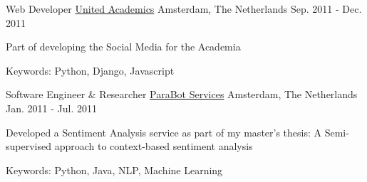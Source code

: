 \begin{cventries}
  \cventry
    {Web Developer} %
    {\href{http://www.ua-foundation.org/}{United Academics}} %
    {Amsterdam, The Netherlands} %
    {Sep. 2011 - Dec. 2011} %
    {
      \begin{cvitems} %
        \item {Part of developing the Social Media for the Academia}
        \item {Keywords: Python, Django, Javascript}
      \end{cvitems}
    }

  \cventry
    {Software Engineer \& Researcher} %
    {\href{http://www.parabots.nl//}{ParaBot Services}} %
    {Amsterdam, The Netherlands} %
    {Jan. 2011 - Jul. 2011} %
    {
      \begin{cvitems} %
        \item {Developed a Sentiment Analysis service as part of my master's thesis: A Semi-supervised approach to context-based sentiment analysis}
        \item {Keywords: Python, Java, NLP, Machine Learning}
      \end{cvitems}
    }
\end{cventries}
